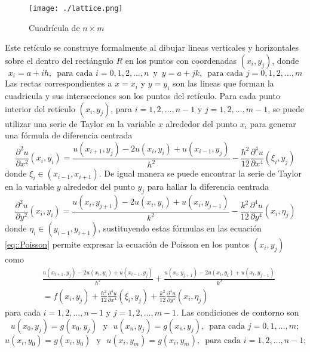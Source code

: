 \documentclass[a4paper]{article}
\begin{document}
\begin{figure}[h]
\begin{center}\label{fig::mesh}
\texttt{[image: ./lattice.png]} 
\end{center} 
\caption{Cuadrícula de $n\times m$}
\end{figure}
Este retículo se construye formalmente al dibujar lineas verticales y horizontales sobre el dentro del rectángulo $R$ en los puntos con coordenadas $(x_i, y_j)$, donde
\begin{equation}
x_i=a+ih,\,\,\,\text{para cada }i=0,1,2,\hdots,n\, \text{ y }\, y=a+jk,\,\,\,\text{para cada }j=0,1,2,\hdots,m
\end{equation}
Las rectas correspondientes a $x=x_i$ y $y=y_i$ son las lineas que forman la cuadricula y sus intersecciones son los puntos del retículo. Para cada punto interior del retículo $(x_i,y_j)$, para $i=1,2,\hdots,n-1$ y $j=1,2,\hdots,m-1$, se puede utilizar una serie de Taylor en la variable $x$ alrededor del punto $x_i$ para generar una fórmula de diferencia centrada
\begin{equation}
\frac{\partial^2 u}{\partial x^2}(x_i,y_i)=\frac{u(x_{i+1},y_j)-2u(x_i,y_i)+u(x_{i-1},y_j)}{h^2}-\frac{h^2}{12}\frac{\partial^4 u}{\partial x^4}(\xi_i,y_j)
\end{equation}
donde $\xi_i \in (x_{i-1},x_{i+1})$. De igual manera se puede encontrar la serie de Taylor en la variable $y$ alrededor del punto $y_j$ para hallar la diferencia centrada
\begin{equation}
\frac{\partial^2 u}{\partial y^2}(x_i,y_i)=\frac{u(x_{i},y_{j+1})-2u(x_i,y_i)+u(x_{i},y_{j-1})}{k^2}-\frac{k^2}{12}\frac{\partial^4 u}{\partial y^4}(x_i,\eta_j)
\end{equation}
donde $\eta_i \in (y_{i-1},y_{i+1})$, sustituyendo estas fórmulas en las ecuación \ref{eq::Poisson} permite expresar la ecuación de Poisson en los puntos $(x_i,y_j)$ como
\begin{equation}
\begin{aligned}
&\frac{u(x_{i+1},y_j)-2u(x_i,y_i)+u(x_{i-1},y_j)}{h^2}+\frac{u(x_{i},y_{j+1})-2u(x_i,y_i)+u(x_{i},y_{j-1})}{k^2}\\
&=f(x_i,y_j)+\frac{h^2}{12}\frac{\partial^4 u}{\partial x^4}(\xi_i,y_j)+\frac{k^2}{12}\frac{\partial^4 u}{\partial y^4}(x_i,\eta_j)
\end{aligned}
\end{equation}
para cada $i=1,2,\hdots,n-1$ y $j=1,2,\hdots,m-1$. Las condiciones de contorno son
\begin{equation*}
u(x_0,y_j)=g(x_0,y_j)\,\, \text{ y } \,\, u(x_n,y_j)=g(x_n,y_j),\,\,\, \text{para cada }j=0,1,\hdots,m;
\end{equation*}
\begin{equation*}
u(x_i,y_0)=g(x_i,y_0)\,\, \text{ y } \,\, u(x_i,y_m)=g(x_i,y_m),\,\,\, \text{para cada }i=1,2,\hdots,n-1;
\end{equation*}
\end{document}
